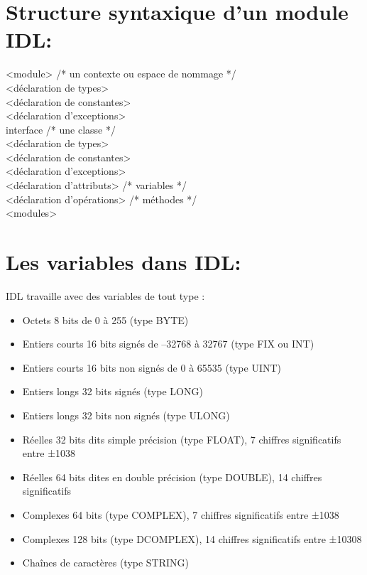 \section{Structure syntaxique d'un module IDL:}

<module> /* un contexte ou espace de nommage */\\

<déclaration de types>\\
<déclaration de constantes>\\
<déclaration d'exceptions>\\

interface /* une classe */\\
<déclaration de types>\\
<déclaration de constantes>\\
<déclaration d'exceptions>\\

<déclaration d'attributs> /* variables */\\
<déclaration d'opérations> /* méthodes */\\
<modules>\\


\section{Les variables dans IDL:}
IDL travaille avec des variables de tout type :
\begin{itemize}[label=$\bullet$]
\item Octets 8 bits de 0 à 255 (type BYTE)
\item Entiers courts 16 bits signés de –32768 à 32767 (type FIX ou INT)
\item Entiers courts 16 bits non signés de 0 à 65535 (type UINT)
\item Entiers longs 32 bits signés (type LONG)
\item Entiers longs 32 bits non signés (type ULONG)
\item Réelles 32 bits dits simple précision (type FLOAT), 7 chiffres significatifs entre ±1038
\item Réelles 64 bits dites en double précision (type DOUBLE), 14 chiffres significatifs
\item Complexes 64 bits (type COMPLEX), 7 chiffres significatifs entre ±1038
\item Complexes 128 bits (type DCOMPLEX), 14 chiffres significatifs entre ±10308
\item Chaînes de caractères (type STRING)
\end{itemize}

